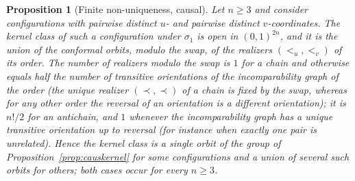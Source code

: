 \documentclass[11pt,a4paper]{article}
\theoremstyle{plain}
\newtheorem{proposition}[theorem]{Proposition}
\theoremstyle{definition}
\theoremstyle{remark}
\begin{document}
\begin{proposition}[Finite non-uniqueness, causal]\label{prop:causnonunique}
Let $n\ge3$ and consider configurations with pairwise distinct $u$- and pairwise distinct $v$-coordinates. The kernel class of such a configuration under $\sigma_1$ is open in $(0,1)^{2n}$, and it is the union of the conformal orbits, modulo the swap, of the realizers $(<_u,<_v)$ of its order. The number of realizers modulo the swap is $1$ for a chain and otherwise equals half the number of transitive orientations of the incomparability graph of the order (the unique realizer $(\prec,\prec)$ of a chain is fixed by the swap, whereas for any other order the reversal of an orientation is a different orientation); it is $n!/2$ for an antichain, and $1$ whenever the incomparability graph has a unique transitive orientation up to reversal (for instance when exactly one pair is unrelated). Hence the kernel class is a single orbit of the group of Proposition~\ref{prop:causkernel} for some configurations and a union of several such orbits for others; both cases occur for every $n\ge3$.
\end{proposition}
\end{document}
